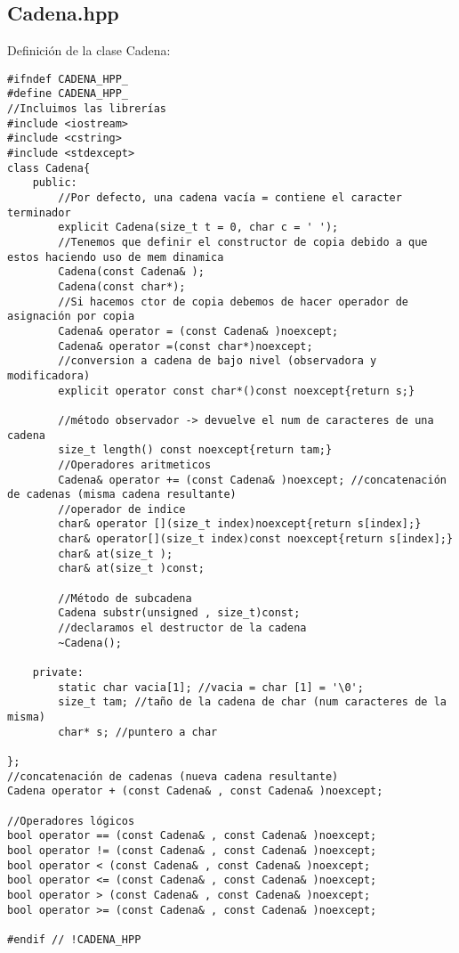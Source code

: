 \subsection{Cadena.hpp}
Definición de la clase Cadena:
\begin{verbatim}
#ifndef CADENA_HPP_
#define CADENA_HPP_
//Incluimos las librerías
#include <iostream>
#include <cstring>
#include <stdexcept>
class Cadena{
    public:
        //Por defecto, una cadena vacía = contiene el caracter terminador
        explicit Cadena(size_t t = 0, char c = ' ');
        //Tenemos que definir el constructor de copia debido a que estos haciendo uso de mem dinamica
        Cadena(const Cadena& );
        Cadena(const char*);
        //Si hacemos ctor de copia debemos de hacer operador de asignación por copia
        Cadena& operator = (const Cadena& )noexcept;
        Cadena& operator =(const char*)noexcept;
        //conversion a cadena de bajo nivel (observadora y modificadora)
        explicit operator const char*()const noexcept{return s;}
        
        //método observador -> devuelve el num de caracteres de una cadena
        size_t length() const noexcept{return tam;}
        //Operadores aritmeticos
        Cadena& operator += (const Cadena& )noexcept; //concatenación de cadenas (misma cadena resultante)
        //operador de indice
        char& operator [](size_t index)noexcept{return s[index];}
        char& operator[](size_t index)const noexcept{return s[index];}
        char& at(size_t );
        char& at(size_t )const;

        //Método de subcadena
        Cadena substr(unsigned , size_t)const;
        //declaramos el destructor de la cadena
        ~Cadena();
        
    private:
        static char vacia[1]; //vacia = char [1] = '\0';
        size_t tam; //taño de la cadena de char (num caracteres de la misma)
        char* s; //puntero a char
        
};
//concatenación de cadenas (nueva cadena resultante)
Cadena operator + (const Cadena& , const Cadena& )noexcept; 

//Operadores lógicos
bool operator == (const Cadena& , const Cadena& )noexcept;
bool operator != (const Cadena& , const Cadena& )noexcept;
bool operator < (const Cadena& , const Cadena& )noexcept;
bool operator <= (const Cadena& , const Cadena& )noexcept;
bool operator > (const Cadena& , const Cadena& )noexcept;
bool operator >= (const Cadena& , const Cadena& )noexcept;

#endif // !CADENA_HPP
\end{verbatim}
